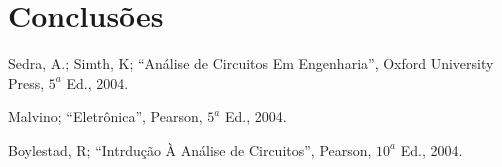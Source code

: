 \documentclass[a4paper,12pt,oneside,openany,table,xcdraw]{article}
\begin{document}
\section{Conclusões} %

\newpage
\begin{thebibliography}{9} 
    Sedra, A.; Simth, K; 
    “Análise de Circuitos Em Engenharia”, Oxford University Press, $5^a$ Ed., 2004.

    Malvino; 
    “Eletrônica”, Pearson, $5^a$ Ed., 2004.

    Boylestad, R;
    “Intrdução À Análise de Circuitos”, Pearson, $10^a$ Ed., 2004.

\end{thebibliography}
\end{document}
